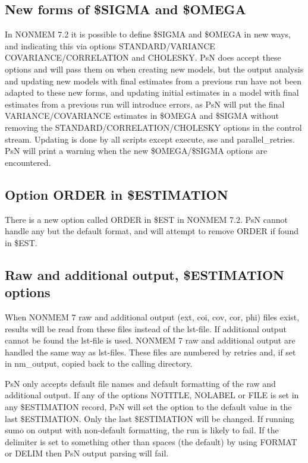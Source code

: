 	\subsection{New forms of \$SIGMA and \$OMEGA}
	In NONMEM 7.2 it is possible to define \$SIGMA and \$OMEGA in new ways, and indicating this via options STANDARD/VARIANCE COVARIANCE/CORRELATION and CHOLESKY. PsN does accept these options and will pass them on when creating new models, but the output analysis and updating new models with final estimates from a previous run have not been adapted to these new forms, and updating initial estimates in a model with final estimates from a previous run will introduce errors, as PsN will put the final VARIANCE/COVARIANCE estimates
	in \$OMEGA and \$SIGMA without removing the STANDARD/CORRELATION/CHOLESKY options in the control stream. Updating is done by all scripts except execute, sse and parallel\_retries. PsN will print a warning when the new \$OMEGA/\$SIGMA options are encountered.
	
	\subsection{Option ORDER in \$ESTIMATION}
	There is a new option called ORDER in \$EST in NONMEM 7.2. PsN cannot handle any but the default format, and will attempt to remove ORDER if found in \$EST.
	
	\subsection{Raw and additional output, \$ESTIMATION options}
	
	When NONMEM 7 raw and additional output (ext, coi, cov, cor, phi) files exist, results will be read from these files instead of the lst-file. If additional output cannot be found the lst-file is used. NONMEM 7 raw and additional output are handled the same way as lst-files. These files are numbered by retries and, if set in nm\_output, copied back to the calling directory.
	
	PsN only accepts default file names and default formatting of the raw and additional output. If any of the options NOTITLE, NOLABEL or FILE is set in any \$ESTIMATION record, PsN will set the option to the default value in the last \$ESTIMATION. Only the last \$ESTIMATION will be changed. If running sumo on output with non-default formatting, the run is likely to fail. If the delimiter is set to something other than spaces (the default) by using FORMAT or DELIM then PsN output parsing will fail.
	
